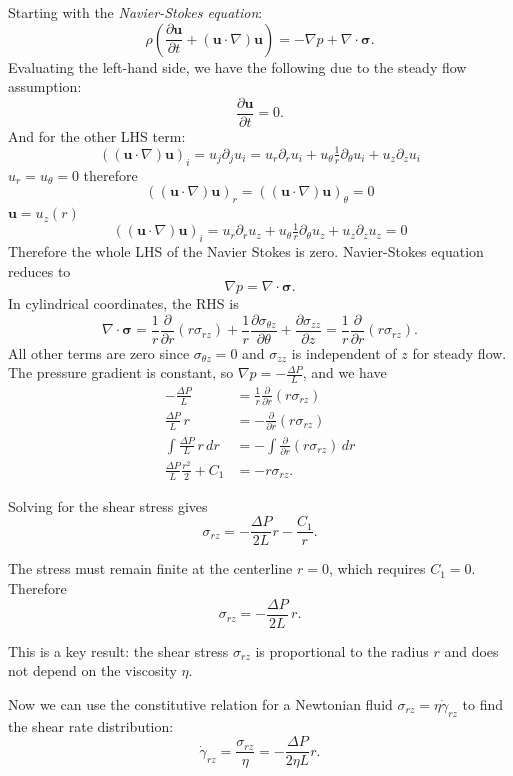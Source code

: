 \documentclass[12pt, a4paper]{article}
\numberwithin{equation}{section}
\begin{document}
Starting with the \emph{Navier-Stokes equation}:
\[
	\rho \left( \frac{\partial \mathbf{u}}{\partial t} + (\mathbf{u}\cdot\nabla)\mathbf{u} \right) = -\nabla p + \nabla\cdot\boldsymbol{\sigma}.
\]
Evaluating the left-hand side, we have the following due to the steady flow assumption:
\[
	\frac{\partial \mathbf{u}}{\partial t} = 0.
\]
And for the other LHS term:
\[
	((\mathbf{u}\cdot\nabla)\mathbf{u})_i
	= u_j \partial_j u_i
	= u_r \partial_r u_i + u_\theta \tfrac1r\partial_\theta u_i + u_z \partial_z u_i
\]
$u_r = u_\theta = 0$ therefore
\[
	((\mathbf{u}\cdot\nabla)\mathbf{u})_r = 
	((\mathbf{u}\cdot\nabla)\mathbf{u})_\theta = 0
\]
$\mathbf{u} = u_z(r)$
\[
	((\mathbf{u}\cdot\nabla)\mathbf{u})_i
	= u_r \partial_r u_z + u_\theta \tfrac1r\partial_\theta u_z + u_z \partial_z u_z = 0
\]
Therefore the whole LHS of the Navier Stokes is zero. Navier-Stokes equation reduces to
\[
	\nabla p = \nabla\cdot\boldsymbol{\sigma}.
\]
In cylindrical coordinates, the RHS is 
\[
	\nabla\cdot\boldsymbol{\sigma} = 
	\frac{1}{r}\frac{\partial}{\partial r}(r\sigma_{rz}) + 
	\frac{1}{r}\frac{\partial \sigma_{\theta z}}{\partial \theta} + 
	\frac{\partial \sigma_{zz}}{\partial z}
	= \frac{1}{r}\frac{\partial}{\partial r}(r\sigma_{rz}).
\]
All other terms are zero since $\sigma_{\theta z} = 0$ and $\sigma_{zz}$ is independent of $z$ for steady flow. The pressure gradient is constant, so $\nabla p = -\frac{\Delta P}{L}$, and we have
\begin{align*}
	-\frac{\Delta P}{L} &= \frac{1}{r}\frac{\partial}{\partial r}(r\sigma_{rz})\\
	\frac{\Delta P}{L}\, r &= -\frac{\partial}{\partial r}(r\sigma_{rz})\\
	\int \frac{\Delta P}{L}\, r\,dr
	&= -\int \frac{\partial}{\partial r}(r\sigma_{rz})\,dr\\
	\frac{\Delta P}{L}\frac{r^2}{2} + C_1
	&= -r\sigma_{rz}.
\end{align*}

Solving for the shear stress gives
\[
	\sigma_{rz}
	=
	-\frac{\Delta P}{2L} r - \frac{C_1}{r}.
\]

The stress must remain finite at the centerline $r=0$, which requires $C_1 = 0$. Therefore
\[
	\boxed{\sigma_{rz} = - \frac{\Delta P}{2L}\, r}.
\]

This is a key result: the shear stress $\sigma_{rz}$ is proportional to the radius $r$ and does not depend on the viscosity $\eta$.

Now we can use the constitutive relation for a Newtonian fluid $\sigma_{rz} = \eta \dot\gamma_{rz}$ to find the shear rate distribution:
\[
	\dot\gamma_{rz}
	=
	\frac{\sigma_{rz}}{\eta}
	=
	- \frac{\Delta P}{2\eta L} r.
\]
\end{document}
